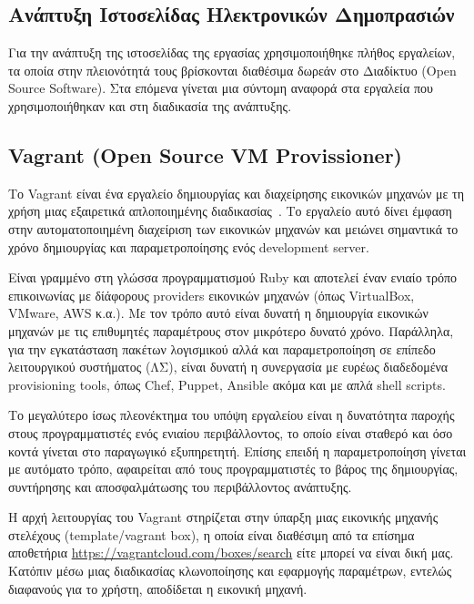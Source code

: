 \documentclass[12pt]{report}
\begin{document}
\begin{itemize}
\chapter{Ανάπτυξη Ιστοσελίδας Ηλεκτρονικών Δημοπρασιών}\label{ch3}
Για την ανάπτυξη της ιστοσελίδας της εργασίας χρησιμοποιήθηκε πλήθος εργαλείων, τα οποία στην πλειονότητά τους βρίσκονται διαθέσιμα δωρεάν στο Διαδίκτυο (\textlatin{Open Source Software}). Στα επόμενα γίνεται μια σύντομη αναφορά στα εργαλεία που χρησιμοποιήθηκαν και στη διαδικασία της ανάπτυξης.

\section{\textlatin{\textlatin{Vagrant (Open Source VM Provissioner)}}}\label{vagrant}
Το \textlatin{Vagrant} είναι ένα εργαλείο δημιουργίας και διαχείρησης εικονικών μηχανών με τη χρήση μιας εξαιρετικά απλοποιημένης διαδικασίας~\cite{vagrant_by_hashicorp}. Το εργαλείο αυτό δίνει έμφαση στην αυτοματοποιημένη διαχείριση των εικονικών μηχανών και μειώνει σημαντικά το χρόνο δημιουργίας και παραμετροποίησης ενός \textlatin{development server}.

Είναι γραμμένο στη γλώσσα προγραμματισμού \textlatin{Ruby} και αποτελεί έναν ενιαίο τρόπο επικοινωνίας με δίάφορους \textlatin{providers} εικονικών μηχανών (όπως \textlatin{VirtualBox, VMware, AWS} κ.α.). Με τον τρόπο αυτό είναι δυνατή η δημιουργία εικονικών μηχανών με τις επιθυμητές παραμέτρους στον μικρότερο δυνατό χρόνο. Παράλληλα, για την εγκατάσταση πακέτων λογισμικού αλλά και παραμετροποίηση σε επίπεδο λειτουργικού συστήματος (ΛΣ), είναι δυνατή η συνεργασία με ευρέως διαδεδομένα \textlatin{provisioning tools}, όπως \textlatin{Chef, Puppet, Ansible} ακόμα και με απλά \textlatin{shell scripts}.

Το μεγαλύτερο ίσως πλεονέκτημα του υπόψη εργαλείου είναι η δυνατότητα παροχής στους προγραμματιστές ενός ενιαίου περιβάλλοντος, το οποίο είναι σταθερό και όσο κοντά γίνεται στο παραγωγικό εξυπηρετητή. Επίσης επειδή η παραμετροποίηση γίνεται με αυτόματο τρόπο, αφαιρείται από τους προγραμματιστές το βάρος της δημιουργίας, συντήρησης και αποσφαλμάτωσης του περιβάλλοντος ανάπτυξης.

Η αρχή λειτουργίας του \textlatin{Vagrant} στηρίζεται στην ύπαρξη μιας εικονικής μηχανής στελέχους (\textlatin{template/vagrant box}), η οποία είναι διαθέσιμη από τα επίσημα αποθετήρια \textlatin{\url{https://vagrantcloud.com/boxes/search}} είτε μπορεί να είναι δική μας. Κατόπιν μέσω μιας διαδικασίας κλωνοποίησης και εφαρμογής παραμέτρων, εντελώς διαφανούς για το χρήστη, αποδίδεται η εικονική μηχανή.


\end{itemize}
\end{document}
